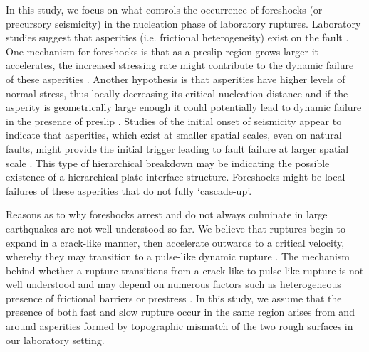 \documentclass[draft]{agujournal2019}
\begin{document}
In this study, we focus on what controls the occurrence of foreshocks (or precursory seismicity) in the nucleation phase of laboratory ruptures. Laboratory studies suggest that asperities (i.e. frictional heterogeneity) exist on the fault \cite{Selvadurai2015, Selvadurai2017}. One mechanism for foreshocks is that as a preslip region grows larger it accelerates, the increased stressing rate might contribute to the dynamic failure of these asperities \cite{McLaskey2013}.  Another hypothesis is that asperities have higher levels of normal stress, thus locally decreasing its critical nucleation distance and if the asperity is geometrically large enough it could potentially lead to dynamic failure in the presence of preslip \cite{Veedu2016, Selvadurai2017, Schaal2019}.  Studies of the initial onset of seismicity appear to indicate that asperities, which exist at smaller spatial scales, even on natural faults, might provide the initial trigger leading to fault failure at larger spatial scale \cite{Iio1995, Ellsworth1995, Beroza1996, Okuda2018}.  This type of hierarchical breakdown may be indicating the possible existence of a hierarchical plate interface structure.  Foreshocks might be local failures of these asperities that do not fully `cascade-up’.  

Reasons as to why foreshocks arrest and do not always culminate in large earthquakes are not well understood so far. We believe that ruptures begin to expand in a crack-like manner, then accelerate outwards to a critical velocity, whereby they may transition to a pulse-like dynamic rupture \cite{Heaton1990, Meier2016}.  The mechanism behind whether a rupture transitions from a crack-like to pulse-like rupture is not well understood and may depend on numerous factors such as heterogeneous presence of frictional barriers or prestress \cite{Rubinstein2004, Maegawa2010, Tromborg2011, Kammer2012, Otsuki2013, Kammer2015, Selvadurai2017a, Ke2018}. In this study, we assume that the presence of both fast and slow rupture occur in the same region arises from and around asperities formed by topographic mismatch of the two rough surfaces in our laboratory setting.
\end{document}
